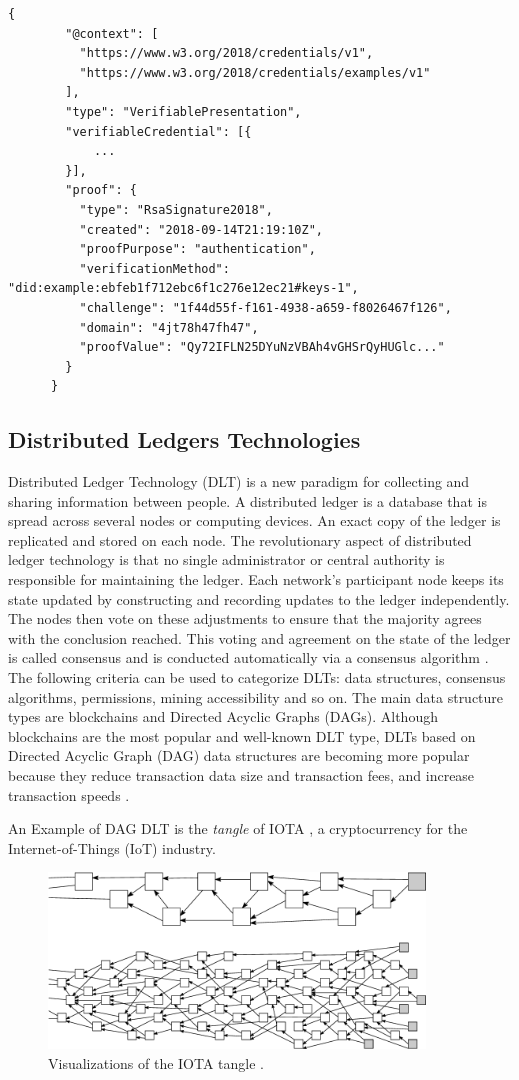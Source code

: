 \begin{lstlisting}[caption={A simple example of a verifiable presentation \cite{vcW3C}.},captionpos=b,style=json, label={vpExample},breaklines=true,frame=single]
    {
        "@context": [
          "https://www.w3.org/2018/credentials/v1",
          "https://www.w3.org/2018/credentials/examples/v1"
        ],
        "type": "VerifiablePresentation",
        "verifiableCredential": [{
            ...
        }],
        "proof": {
          "type": "RsaSignature2018",
          "created": "2018-09-14T21:19:10Z",
          "proofPurpose": "authentication",
          "verificationMethod": "did:example:ebfeb1f712ebc6f1c276e12ec21#keys-1",
          "challenge": "1f44d55f-f161-4938-a659-f8026467f126",
          "domain": "4jt78h47fh47",
          "proofValue": "Qy72IFLN25DYuNzVBAh4vGHSrQyHUGlc..."
        }
      }   
\end{lstlisting}

\subsection{Distributed Ledgers Technologies}

Distributed Ledger Technology (DLT)  is a new paradigm for collecting and sharing information between people. A distributed ledger is a database that is spread across several nodes or computing devices. An exact copy of the ledger is replicated and stored on each node. The revolutionary aspect of distributed ledger technology is that no single administrator or central authority is responsible for maintaining the ledger. Each network's participant node keeps its state updated by constructing and recording updates to the ledger independently. The nodes then vote on these adjustments to ensure that the majority agrees with the conclusion reached. This voting and agreement on the state of the ledger is called consensus and is conducted automatically via a consensus algorithm \cite{dlt-intro-1}. 
The following criteria can be used to categorize DLTs: data structures, consensus algorithms, permissions, mining accessibility and so on. The main data structure types are blockchains and Directed Acyclic Graphs (DAGs). Although blockchains are the most popular and well-known DLT type,  DLTs based on Directed Acyclic Graph (DAG) data structures are becoming more popular because they reduce transaction data size and transaction fees, and increase transaction speeds \cite{dlt-intro-2}.

An Example of DAG DLT is the \textit{tangle} of IOTA \cite{popov2018tangle}, a cryptocurrency for the Internet-of-Things (IoT) industry.

\begin{figure}[h!]
    \centering
    \includegraphics[width=10cm]{./chapters/images/tangle.png}
    \caption{Visualizations of the IOTA tangle \cite{popov2018tangle}.}
    \label{tangleFigure}
\end{figure}

